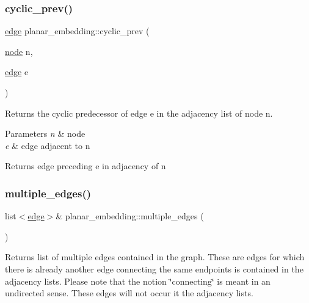 \subsubsection{\texorpdfstring{cyclic\+\_\+prev()}{cyclic\_prev()}}
{\footnotesize\ttfamily \mbox{\hyperlink{classedge}{edge}} planar\+\_\+embedding\+::cyclic\+\_\+prev (\begin{DoxyParamCaption}\item[{\mbox{\hyperlink{classnode}{node}}}]{n,  }\item[{\mbox{\hyperlink{classedge}{edge}}}]{e }\end{DoxyParamCaption})}

Returns the cyclic predecessor of edge {\ttfamily e} in the adjacency list of node {\ttfamily n}.


\begin{DoxyParams}{Parameters}
{\em n} & node \\
\hline
{\em e} & edge adjacent to {\ttfamily n} \\
\hline
\end{DoxyParams}
\begin{DoxyReturn}{Returns}
edge preceding {\ttfamily e} in adjacency of {\ttfamily n} 
\end{DoxyReturn}
\mbox{\label{classplanar__embedding_afb50ef8f3b5b2c6690b9d364db21f36f}} 
\subsubsection{\texorpdfstring{multiple\+\_\+edges()}{multiple\_edges()}\hspace{0.1cm}{\footnotesize\ttfamily [1/2]}}
{\footnotesize\ttfamily list$<$\mbox{\hyperlink{classedge}{edge}}$>$\& planar\+\_\+embedding\+::multiple\+\_\+edges (\begin{DoxyParamCaption}{ }\end{DoxyParamCaption})\hspace{0.3cm}{\ttfamily [inline]}}

Returns list of multiple edges contained in the graph. These are edges for which there is already another edge connecting the same endpoints is contained in the adjacency lists. Please note that the notion \char`\"{}connecting\char`\"{} is meant in an undirected sense. These edges will not occur it the adjacency lists.



